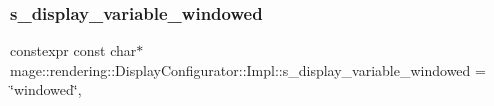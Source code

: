 \subsubsection{\texorpdfstring{s\+\_\+display\+\_\+variable\+\_\+windowed}{s\_display\_variable\_windowed}}
{\footnotesize\ttfamily constexpr const char$\ast$ mage\+::rendering\+::\+Display\+Configurator\+::\+Impl\+::s\+\_\+display\+\_\+variable\+\_\+windowed = \char`\"{}windowed\char`\"{}\hspace{0.3cm}{\ttfamily [static]}, {\ttfamily [private]}}


